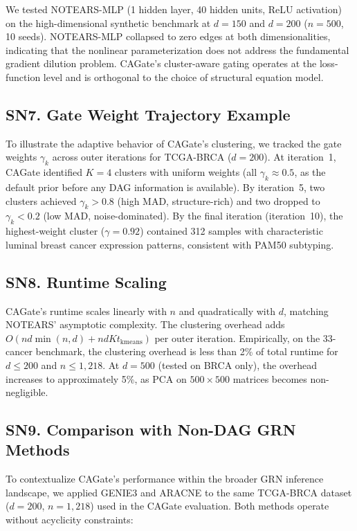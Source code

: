 \documentclass[11pt,a4paper]{article}
\begin{document}
We tested NOTEARS-MLP (1 hidden layer, 40 hidden units, ReLU activation) on the high-dimensional synthetic benchmark at $d = 150$ and $d = 200$ ($n=500$, 10 seeds). NOTEARS-MLP collapsed to zero edges at both dimensionalities, indicating that the nonlinear parameterization does not address the fundamental gradient dilution problem. CAGate's cluster-aware gating operates at the loss-function level and is orthogonal to the choice of structural equation model.

\subsection*{SN7. Gate Weight Trajectory Example}

To illustrate the adaptive behavior of CAGate's clustering, we tracked the gate weights $\gamma_k$ across outer iterations for TCGA-BRCA ($d=200$). At iteration~1, CAGate identified $K=4$ clusters with uniform weights (all $\gamma_k \approx 0.5$, as the default prior before any DAG information is available). By iteration~5, two clusters achieved $\gamma_k > 0.8$ (high MAD, structure-rich) and two dropped to $\gamma_k < 0.2$ (low MAD, noise-dominated). By the final iteration (iteration~10), the highest-weight cluster ($\gamma = 0.92$) contained 312 samples with characteristic luminal breast cancer expression patterns, consistent with PAM50 subtyping.

\subsection*{SN8. Runtime Scaling}

CAGate's runtime scales linearly with $n$ and quadratically with $d$, matching NOTEARS' asymptotic complexity. The clustering overhead adds $O(n d \min(n,d) + n d K t_{\text{kmeans}})$ per outer iteration. Empirically, on the 33-cancer benchmark, the clustering overhead is less than 2\% of total runtime for $d \leq 200$ and $n \leq 1,218$. At $d=500$ (tested on BRCA only), the overhead increases to approximately 5\%, as PCA on $500 \times 500$ matrices becomes non-negligible.

\subsection*{SN9. Comparison with Non-DAG GRN Methods}

To contextualize CAGate's performance within the broader GRN inference landscape, we applied GENIE3 and ARACNE to the same TCGA-BRCA dataset ($d=200$, $n=1,218$) used in the CAGate evaluation. Both methods operate without acyclicity constraints:
\end{document}
